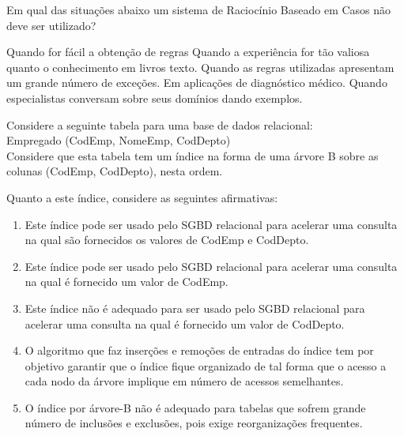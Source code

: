 \documentclass[12pt, addpoints]{exam}
\begin{document}
\begin{questions}
\question

Em qual das situações abaixo um sistema de Raciocínio Baseado em Casos não deve ser utilizado?


\begin{choices}
\choice Quando for fácil a obtenção de regras
\choice Quando a experiência for tão valiosa quanto o conhecimento em livros texto.
\choice Quando as regras utilizadas apresentam um grande número de exceções.
\choice Em aplicações de diagnóstico médico.
\choice Quando especialistas conversam sobre seus domínios dando exemplos.
\end{choices}

\question

Considere a seguinte tabela para uma base de dados relacional:\\

Empregado (CodEmp, NomeEmp, CodDepto)\\

Considere que esta tabela tem um índice na forma de uma árvore B sobre as colunas (CodEmp, CodDepto), nesta ordem.

Quanto a este índice, considere as seguintes afirmativas:

\begin{enumerate}

    \item Este índice pode ser usado pelo SGBD relacional para acelerar uma consulta na qual são fornecidos os valores de CodEmp e CodDepto.

    \item Este índice pode ser usado pelo SGBD relacional para acelerar uma consulta na qual é fornecido um valor de CodEmp.

    \item Este índice não é adequado para ser usado pelo SGBD relacional para acelerar uma consulta na qual é fornecido um valor de CodDepto.

    \item O algoritmo que faz inserções e remoções de entradas do índice tem por objetivo garantir que o índice fique organizado de tal forma que o acesso a cada nodo da árvore implique em número de acessos semelhantes.

    \item O índice por árvore-B não é adequado para tabelas que sofrem grande número de inclusões e exclusões, pois exige reorganizações frequentes.

\end{enumerate}






\end{questions}
\end{document}
